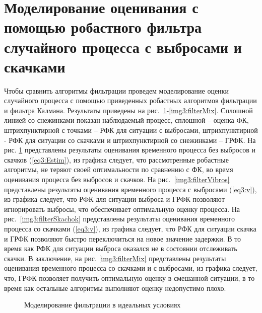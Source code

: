 \section{Моделирование оценивания с помощью робастного фильтра случайного процесса с выбросами и скачками} \label{sect3_6}
Чтобы сравнить алгоритмы фильтрации проведем моделирование оценки случайного процесса с помощью приведенных робастных алгоритмов фильтрации и фильтра Калмана. Результаты приведены на рис. \ref{img3:filterIdeal}-\ref{img3:filterMix}. Сплошной линией со снежинками показан наблюдаемый процесс, сплошной – оценка ФК, штрихпунктирной с точками – РФК для ситуации с выбросами, штрихпунктирной - РФК для ситуации со скачками и штрихпунктирной со снежинками – ГРФК. На рис. \ref{img3:filterIdeal} представлены результаты оценивания временного процесса без выбросов и скачков (\ref{eq3:Estim}), из графика следует, что рассмотренные робастные алгоритмы, не теряют своей оптимальности по сравнению с ФК, во время оценивания процесса без выбросов и скачков.
На рис. \ref{img3:filterVibros} представлены результаты оценивания временного процесса с выбросами (\ref{eq3:v}), из графика следует, что РФК для ситуации выброса и ГРФК позволяют игнорировать выбросы, что обеспечивает оптимальную оценку процесса.
На рис. \ref{img3:filterSkachok} представлены результаты оценивания временного процесса со скачками (\ref{eq3:v}), из графика следует, что РФК для ситуации скачка и ГРФК позволяют быстро переключиться на новое значение задержки. В то время как РФК для ситуации выброса оказался не в состоянии отслеживать скачки.
В заключение, на рис. \ref{img3:filterMix} представлены результаты оценивания временного процесса со скачками и с выбросами, из графика следует, что, ГРФК позволяет получить оптимальную оценку в смешанной ситуации, в то время как остальные алгоритмы выполняют оценку недопустимо плохо.


\pgfplotsset{width=15cm, height=10cm, compat=1.3}
\begin{figure} [h]
  \center
{}
\caption{Моделирование фильтрации в идеальных условиях}
  \label{img3:filterIdeal}
\end{figure}

